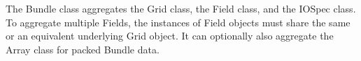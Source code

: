

The Bundle class aggregates the Grid class, the Field class,
and the IOSpec class.
To aggregate multiple Fields, the
instances of Field objects must share the same or an 
equivalent underlying Grid object.  It can optionally
also aggregate the Array class for packed Bundle data.



